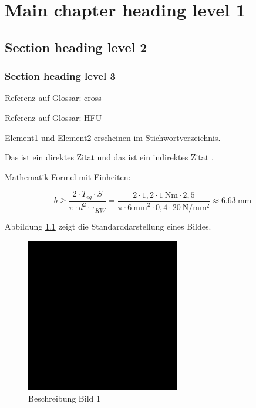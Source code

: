
\chapter{Main chapter heading level 1}

\section{Section heading level 2}

\subsection{Section heading level 3}

Referenz auf Glossar: \gls{cross} 

Referenz auf Glossar: \gls{HFU}

Element1 und Element2 erscheinen im Stichwortverzeichnis.

\grqq Das ist ein direktes Zitat \parencite[S. 52-54]{example}\glqq{} und das ist ein indirektes Zitat \parencite{examplewebsite}.

Mathematik-Formel mit Einheiten:

\begin{center}
    \vspace*{-12pt}
    \[ b \geq \frac{2 \cdot T_{eq} \cdot S}{\pi \cdot d^2 \cdot \tau_{KW}} = \frac{2 \cdot 1,2 \cdot \SI[]{1}[]{\N\m} \cdot 2,5}{\pi \cdot \SI[]{6}[]{\mm}^2 \cdot 0,4 \cdot \SI[]{20}[]{\N\per\mm\squared}} \approx \SI[]{6,63}[]{\mm} \]
\end{center}

Abbildung \ref{fig:example1} zeigt die Standarddarstellung eines Bildes.

\begin{figure}[h]
    \centering
    \includegraphics[width=0.6\textwidth]{images/example.png}
    \caption{Beschreibung Bild 1}
    \label{fig:example1}
\end{figure}

